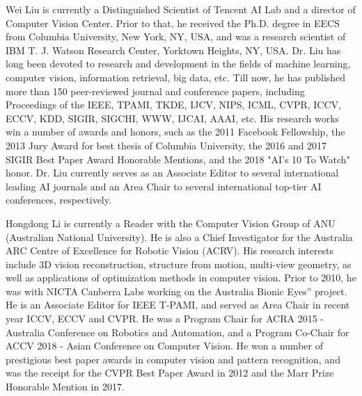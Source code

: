 \documentclass[journal]{IEEEtran}
\begin{document}
\begin{IEEEbiography}{Wei Liu}
is currently a Distinguished Scientist of Tencent AI Lab and a director of Computer Vision Center. Prior to that, he received the Ph.D. degree in EECS from Columbia University, New York, NY, USA, and was a research scientist of IBM T. J. Watson Research Center, Yorktown Heights, NY, USA. Dr. Liu has long been devoted to research and development in the fields of machine learning, computer vision, information retrieval, big data, etc. Till now, he has published more than 150 peer-reviewed journal and conference papers, including Proceedings of the IEEE, TPAMI, TKDE, IJCV, NIPS, ICML, CVPR, ICCV, ECCV, KDD, SIGIR, SIGCHI, WWW, IJCAI, AAAI, etc. His research works win a number of awards and honors, such as the 2011 Facebook Fellowship, the 2013 Jury Award for best thesis of Columbia University, the 2016 and 2017 SIGIR Best Paper Award Honorable Mentions, and the 2018 "AI's 10 To Watch" honor. Dr. Liu currently serves as an Associate Editor to several international leading AI journals and an Area Chair to several international top-tier AI conferences, respectively.

\end{IEEEbiography}

\begin{IEEEbiography}{Hongdong Li} is currently a Reader with the Computer Vision Group of ANU (Australian National University). He is also a Chief Investigator for the Australia ARC Centre of Excellence for Robotic Vision (ACRV). His research interests include 3D vision reconstruction, structure from motion, multi-view geometry, as well as applications of optimization methods in computer vision.  Prior to 2010, he was with NICTA Canberra Labs working on the Australia Bionic Eyes” project.  He is an Associate Editor for IEEE T-PAMI, and served as Area Chair in recent year ICCV, ECCV and CVPR.  He was a Program Chair for ACRA 2015 - Australia Conference on Robotics and Automation, and a Program Co-Chair for ACCV 2018 - Asian Conference on Computer Vision. He won a number of prestigious best paper awards in computer vision and pattern recognition, and was the receipt for the CVPR Best Paper Award in 2012 and the Marr Prize Honorable Mention in 2017.

\end{IEEEbiography}
\end{document}
